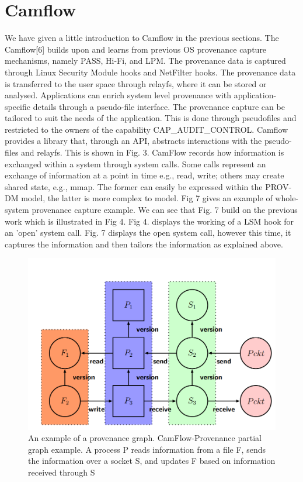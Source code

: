 


\section{Camflow}
We have given a little introduction to Camflow in the previous sections. The Camflow[6] builds upon and learns from previous
OS provenance capture mechanisms, namely PASS, Hi-Fi,
and LPM. The provenance data is captured through Linux
Security Module hooks and NetFilter hooks. The provenance data is transferred to the user space through relayfs,
where it can be stored or analysed. Applications can enrich system level provenance with application-specific details
through a pseudo-file interface. The provenance capture can
be tailored to suit the needs of the application. This is
done through pseudofiles and restricted to the owners of the
capability CAP\_AUDIT\_CONTROL. Camflow provides a library that,
through an API, abstracts interactions with the pseudo-files
and relayfs. This is shown in Fig. 3. 
\vskip 0.1in
CamFlow records how information is exchanged within a system
through system calls. Some calls represent an exchange of information at a point in time e.g., read, write; others may create shared
state, e.g., mmap. The former can easily be expressed within the
PROV-DM model, the latter is more complex to model.
Fig 7 gives an example of whole-system provenance capture example. We can see that Fig. 7 build on the previous work which is illustrated in Fig 4. Fig 4. displays the working of a LSM hook for an 'open' system call. Fig. 7 displays the open system call, however this time, it captures the information and then tailors the information as explained above.
\begin{figure}
	\centering
	\includegraphics[width=0.7\linewidth]{provenance-g}
	\caption{An example of a provenance graph. CamFlow-Provenance partial graph example. A process P reads information from a file F, sends the information
		over a socket S, and updates F based on information received
		through S}
	\label{fig:provenance-g}
\end{figure}

